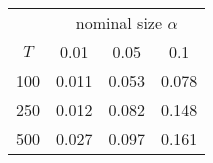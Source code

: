 % 
\begin{tabular}{cccc}
  \hline
  & \multicolumn{3}{c}{nominal size $\alpha$} \\
 $T$ & 0.01 & 0.05 & 0.1 \\
 \hline
100 & 0.011 & 0.053 & 0.078 \\ 
  250 & 0.012 & 0.082 & 0.148 \\ 
  500 & 0.027 & 0.097 & 0.161 \\ 
   \hline
\end{tabular}
